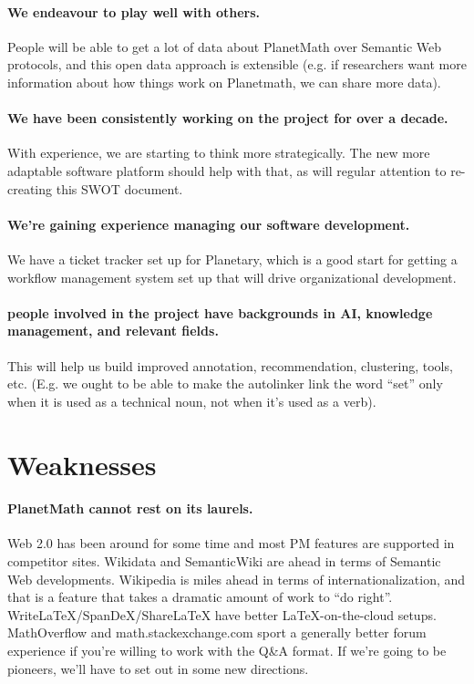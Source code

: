 \paragraph{We endeavour to play well with others.}  People will be able to
get a lot of data about PlanetMath over Semantic Web protocols, and
this open data approach is extensible (e.g. if researchers want more
information about how things work on Planetmath, we can share more
data).

\paragraph{We have been consistently working on the project for over a
  decade.}  With experience, we are starting to think more
strategically.  The new more adaptable software platform should help
with that, as will regular attention to re-creating this SWOT
document.

\paragraph{We're gaining experience managing our software development.}  We
have a ticket tracker set up for Planetary, which is a good start for
getting a workflow management system set up that will drive
organizational development.

\paragraph{people involved in the project have backgrounds in AI, knowledge
  management, and relevant fields.}  This will help us build improved
annotation, recommendation, clustering, tools, etc. (E.g. we ought to
be able to make the autolinker link the word ``set'' only when it is
used as a technical noun, not when it's used as a verb).

\section*{Weaknesses}

\paragraph{PlanetMath cannot rest on its laurels.}  Web 2.0 has been around
for some time and most PM features are supported in competitor sites.
Wikidata and SemanticWiki are ahead in terms of Semantic Web
developments. Wikipedia is miles ahead in terms of
internationalization, and that is a feature that takes a dramatic
amount of work to ``do right''.  WriteLaTeX/SpanDeX/ShareLaTeX have
better LaTeX-on-the-cloud setups.  MathOverflow and
math.stackexchange.com sport a generally better forum experience if
you're willing to work with the Q\&A format.  If we're going to be
pioneers, we'll have to set out in some new directions.

